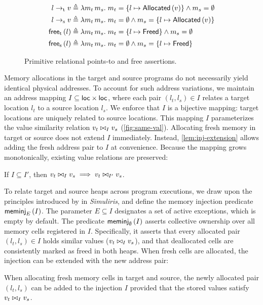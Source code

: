 \documentclass[report.tex]{subfiles}
\begin{document}
\begin{figure}
  \begin{align*}
    \ptrt{l}{v}
    &
      \triangleq
      \lambda m_t\, m_s.\;
      m_t = \{ l \mapsto \Allocated{v} \} \land m_s = \emptyset
    \\
    \ptrs{l}{v}
    &
      \triangleq
      \lambda m_t\, m_s.\;
      m_t = \emptyset \land m_s = \{ l \mapsto \Allocated{v} \}
    \\
    \freet{l}
    &
      \triangleq
      \lambda m_t\, m_s.\;
      m_t = \{ l \mapsto \Freed \} \land m_s = \emptyset
    \\
    \frees{l}
    &
      \triangleq
      \lambda m_t\, m_s.\;
      m_t = \emptyset \land m_s = \{ l \mapsto \Freed \}
  \end{align*}
  \caption{Primitive relational points-to and free assertions.}
  \label{fig:rel-assertion}
\end{figure}

Memory allocations in the target and source programs
do not necessarily yield identical physical addresses.
To account for such address variations,
we maintain an address mapping $I \subseteq \loc \times \loc$,
where each pair $(l_t, l_s) \in I$ relates a target location $l_t$
to a source location $l_s$.
We enforce that $I$ is a bijective mapping:
target locations are uniquely related to source locations.
This mapping $I$ parameterizes the value similarity relation
$\sameval{I}{v_t}{v_s}$ (\cref{fig:same-val}).
Allocating fresh memory in target or source does not extend $I$ immediately.
Instead,
\cref{lem:inj-extension} allows adding
the fresh address pair to $I$ at convenience.
Because the mapping grows monotonically,
existing value relations are preserved:
\begin{lemma}
  \label{lem:sameval-mono}
  If $I \subseteq I'$,
  then $\sameval{I}{v_t}{v_s} \implies \sameval{I'}{v_t}{v_s}$.
\end{lemma}

To relate target and source heaps across program executions,
we draw upon the principles introduced by \textcite{gaher-22-simuliris}
in \emph{Simuliris},
and define the memory injection predicate $\meminj{I}{E}$.
The parameter $E \subseteq I$ designates a set of active exceptions,
which is empty by default.
The predicate $\meminj{I}{\emptyset}$ asserts collective ownership
over all memory cells registered in $I$.
Specifically,
it asserts that every allocated pair $(l_t, l_s) \in I$
holds similar values ($\sameval{I}{v_t}{v_s}$),
and that deallocated cells are consistently marked as freed in both heaps.
When fresh cells are allocated,
the injection can be extended with the new address pair:
\begin{lemma}
  \label{lem:inj-extension}
  When allocating fresh memory cells in target and source,
  the newly allocated pair $(l_t, l_s)$ can be added to the injection $I$
  provided that the stored values satisfy $\sameval{I}{v_t}{v_s}$.
\end{lemma}
\end{document}
